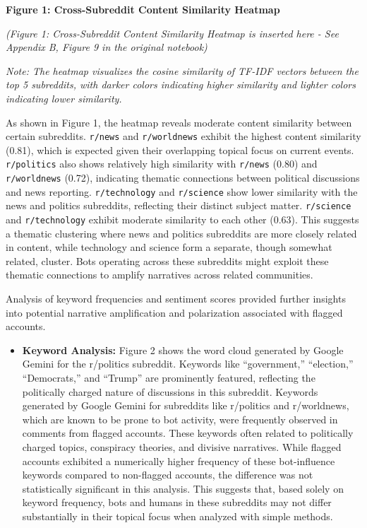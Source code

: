 \documentclass[
  12pt,
  letterpaper,
  DIV=11,
  numbers=noendperiod]{scrartcl}
\providecommand{\tightlist}{%
  \setlength{\itemsep}{0pt}\setlength{\parskip}{0pt}}\usepackage{longtable,booktabs,array}
\begin{document}
\textbf{Figure 1: Cross-Subreddit Content Similarity Heatmap}

\emph{(Figure 1: Cross-Subreddit Content Similarity Heatmap is inserted
here - See Appendix B, Figure 9 in the original notebook)}

\emph{Note: The heatmap visualizes the cosine similarity of TF-IDF
vectors between the top 5 subreddits, with darker colors indicating
higher similarity and lighter colors indicating lower similarity.}

As shown in Figure 1, the heatmap reveals moderate content similarity
between certain subreddits. \texttt{r/news} and \texttt{r/worldnews}
exhibit the highest content similarity (0.81), which is expected given
their overlapping topical focus on current events. \texttt{r/politics}
also shows relatively high similarity with \texttt{r/news} (0.80) and
\texttt{r/worldnews} (0.72), indicating thematic connections between
political discussions and news reporting. \texttt{r/technology} and
\texttt{r/science} show lower similarity with the news and politics
subreddits, reflecting their distinct subject matter. \texttt{r/science}
and \texttt{r/technology} exhibit moderate similarity to each other
(0.63). This suggests a thematic clustering where news and politics
subreddits are more closely related in content, while technology and
science form a separate, though somewhat related, cluster. Bots
operating across these subreddits might exploit these thematic
connections to amplify narratives across related communities.

Analysis of keyword frequencies and sentiment scores provided further
insights into potential narrative amplification and polarization
associated with flagged accounts.

\begin{itemize}
\tightlist
\item
  \textbf{Keyword Analysis:} Figure 2 shows the word cloud generated by
  Google Gemini for the r/politics subreddit. Keywords like
  ``government,'' ``election,'' ``Democrats,'' and ``Trump'' are
  prominently featured, reflecting the politically charged nature of
  discussions in this subreddit. Keywords generated by Google Gemini for
  subreddits like r/politics and r/worldnews, which are known to be
  prone to bot activity, were frequently observed in comments from
  flagged accounts. These keywords often related to politically charged
  topics, conspiracy theories, and divisive narratives. While flagged
  accounts exhibited a numerically higher frequency of these
  bot-influence keywords compared to non-flagged accounts, the
  difference was not statistically significant in this analysis. This
  suggests that, based solely on keyword frequency, bots and humans in
  these subreddits may not differ substantially in their topical focus
  when analyzed with simple methods.
\end{itemize}
\end{document}
